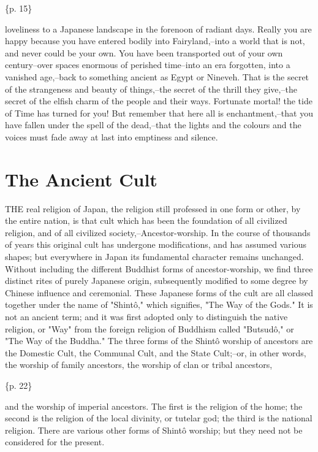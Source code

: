 \{p. 15\}

loveliness to a Japanese landscape in the forenoon of radiant days. Really you are happy because you have entered bodily into Fairyland,--into a world that is not, and never could be your own. You have been transported out of your own century--over spaces enormous of perished time--into an era forgotten, into a vanished age,--back to something ancient as Egypt or Nineveh. That is the secret of the strangeness and beauty of things,--the secret of the thrill they give,--the secret of the elfish charm of the people and their ways. Fortunate mortal! the tide of Time has turned for you! But remember that here all is enchantment,--that you have fallen under the spell of the dead,--that the lights and the colours and the voices must fade away at last into emptiness and silence.

\section{The Ancient Cult}
\label{sec:org5aebe2d}

THE real religion of Japan, the religion still professed in one form or other, by the entire nation, is that cult which has been the foundation of all civilized religion, and of all civilized society,--Ancestor-worship. In the course of thousands of years this original cult has undergone modifications, and has assumed various shapes; but everywhere in Japan its fundamental character remains unchanged. Without including the different Buddhist forms of ancestor-worship, we find three distinct rites of purely Japanese origin, subsequently modified to some degree by Chinese influence and ceremonial. These Japanese forms of the cult are all classed together under the name of "Shintô," which signifies, "The Way of the Gods." It is not an ancient term; and it was first adopted only to distinguish the native religion, or "Way" from the foreign religion of Buddhism called "Butsudô," or "The Way of the Buddha." The three forms of the Shintô worship of ancestors are the Domestic Cult, the Communal Cult, and the State Cult;--or, in other words, the worship of family ancestors, the worship of clan or tribal ancestors,

\{p. 22\}

and the worship of imperial ancestors. The first is the religion of the home; the second is the religion of the local divinity, or tutelar god; the third is the national religion. There are various other forms of Shintô worship; but they need not be considered for the present.

